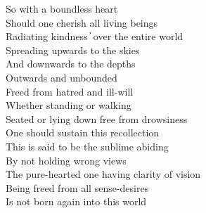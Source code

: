 So with a boundless heart\\
Should one cherish all living beings\\
Radiating kindness  ̓  over the entire world\\
Spreading upwards to the skies\\
And downwards to the depths\\
Outwards and unbounded\\
Freed from hatred and ill-will\\
Whether standing or walking\\
Seated or lying down free from drowsiness\\
One should sustain this recollection\\
This is said to be the sublime abiding\\
By not holding wrong views\\
The pure-hearted one having clarity of vision\\
Being freed from all sense-desires\\
Is not born again into this world


\clearpage

